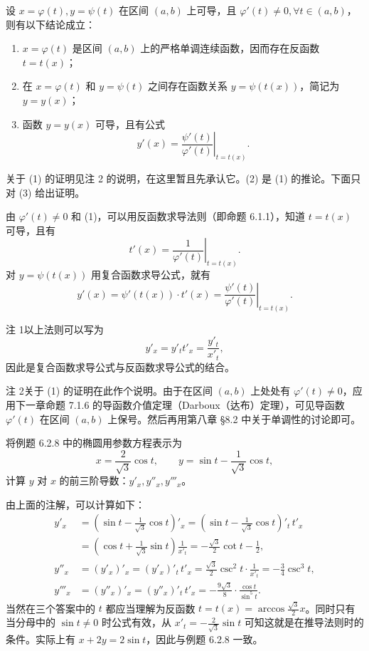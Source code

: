 \begin{xproposition}[6.2.1]
设 $x=\varphi(t),y=\psi(t)$ 在区间 $(a,b)$ 上可导，且 $\varphi'(t)\ne0,\forall t\in(a,b)$，则有以下结论成立：
\begin{enumerate}[label=(\arabic*)]
  \item $x=\varphi(t)$ 是区间 $(a,b)$ 上的严格单调连续函数，因而存在反函数 $t=t(x)$；
  \item 在 $x=\varphi(t)$ 和 $y=\psi(t)$ 之间存在函数关系 $y=\psi(t(x))$，简记为 $y=y(x)$；
  \item 函数 $y=y(x)$ 可导，且有公式
  \[
    y'(x)=\left.\frac{\psi'(t)}{\varphi'(t)}\right|_{t=t(x)}.
  \]
\end{enumerate}
\end{xproposition}
\begin{xproof}
关于 (1) 的证明见注 2 的说明，在这里暂且先承认它。(2) 是 (1) 的推论。下面只对 (3) 给出证明。

由 $\varphi'(t)\ne0$ 和 (1)，可以用反函数求导法则（即命题 6.1.1），知道 $t=t(x)$ 可导，且有
\[
  t'(x)=\left.\frac1{\varphi'(t)}\right|_{t=t(x)}.
\]
对 $y=\psi(t(x))$ 用复合函数求导公式，就有
\[
  y'(x)=\psi'(t(x))\cdot t'(x)
  =\left.\frac{\psi'(t)}{\varphi'(t)}\right|_{t=t(x)}.
\]
\end{xproof}

\begin{xremark}
注 1\quad 以上法则可以写为
\[
  y'_x=y'_t t'_x=\frac{y'_t}{x'_t},
\]
因此是复合函数求导公式与反函数求导公式的结合。

注 2\quad 关于 (1) 的证明在此作个说明。由于在区间 $(a,b)$ 上处处有 $\varphi'(t)\ne0$，应用下一章命题 7.1.6 的导函数介值定理（Darboux（达布）定理），可见导函数 $\varphi'(t)$ 在区间 $(a,b)$ 上保号。然后再用第八章 §8.2 中关于单调性的讨论即可。
\end{xremark}

\begin{xexample}[6.2.9]
将例题 6.2.8 中的椭圆用参数方程表示为
\[
  x=\frac2{\sqrt3}\cos t,\qquad y=\sin t-\frac1{\sqrt3}\cos t,
\]
计算 $y$ 对 $x$ 的前三阶导数：$y'_x,y''_x,y'''_x$。
\end{xexample}
\begin{xsolution}
由上面的注解，可以计算如下：
\begin{align*}
  y'_x
  &=\left(\sin t-\frac1{\sqrt3}\cos t\right)'_x
   =\left(\sin t-\frac1{\sqrt3}\cos t\right)'_t\,t'_x\\
  &=\left(\cos t+\frac1{\sqrt3}\sin t\right)\frac1{x'_t}
   =-\frac{\sqrt3}{2}\cot t-\frac12,\\
  y''_x
  &=(y'_x)'_x=(y'_x)'_t\,t'_x
   =\frac{\sqrt3}{2}\csc^2t\cdot\frac1{x'_t}
   =-\frac34\csc^3t,\\
  y'''_x
  &=(y''_x)'_x=(y''_x)'_t\,t'_x
   =-\frac{9\sqrt3}{8}\cdot\frac{\cos t}{\sin^5t}.
\end{align*}
当然在三个答案中的 $t$ 都应当理解为反函数 $t=t(x)=\arccos\frac{\sqrt3}{2}x$。同时只有当分母中的 $\sin t\ne0$ 时公式有效，从 $x'_t=-\frac2{\sqrt3}\sin t$ 可知这就是在推导法则时的条件。实际上有 $x+2y=2\sin t$，因此与例题 6.2.8 一致。
\end{xsolution}

